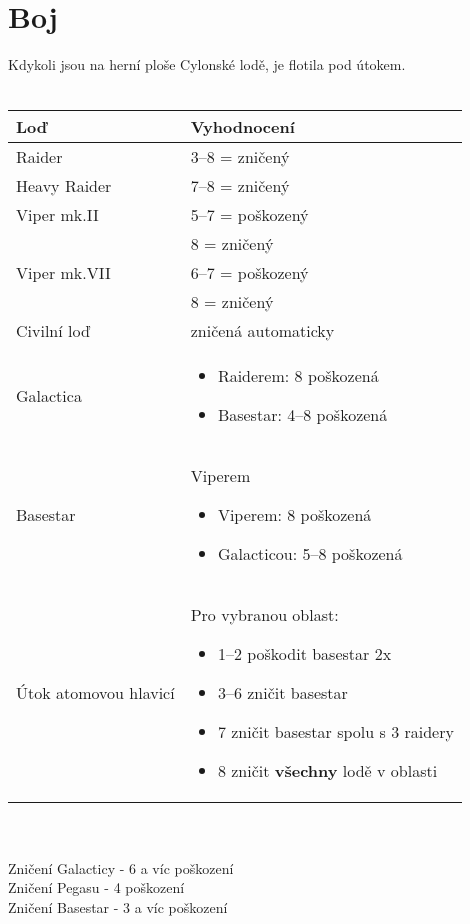 \documentclass[a4paper,twocolumn]{article}
\begin{document}
\section{Boj}
Kdykoli jsou na herní ploše Cylonské lodě, je flotila pod útokem.\\
\\
\begin{tabular}{ | l | p{5.5cm} | }
\hline
\textbf{Loď} & 	\textbf{Vyhodnocení} \\
\hline
Raider & 		3--8 = zničený \\
Heavy Raider & 	7--8 = zničený \\
Viper mk.II & 	5--7 = poškozený \\
&				8 = zničený \\
Viper mk.VII &	6--7 = poškozený \\
&				8 = zničený \\
Civilní loď	&	zničená automaticky\\
Galactica &		\begin{itemize}
				\item[] Raiderem: 8 poškozená 
				\item[] Basestar: 4--8 poškozená
				\end{itemize}
				\\
Basestar & 		Viperem 
				\begin{itemize}
				\item[] Viperem: 8 poškozená
				\item[] Galacticou: 5--8 poškozená 
				\end{itemize}
				\\
Útok atomovou hlavicí & Pro vybranou oblast:
				\begin{itemize}
				\item[] 1--2 poškodit basestar 2x 
				\item[] 3--6 zničit basestar
				\item[] 7 zničit basestar spolu s 3 raidery
				\item[] 8 zničit \textbf{všechny} lodě v oblasti
				\end{itemize}
				\\
\hline
\end{tabular}
\\\\
Zničení Galacticy - 6 a víc poškození\\
Zničení Pegasu - 4 poškození\\
Zničení Basestar - 3 a víc poškození\\
\end{document}

